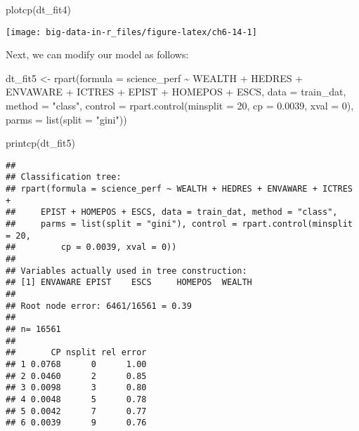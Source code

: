 \documentclass[
]{book}
\newenvironment{Shaded}{\begin{snugshade}}{\end{snugshade}}
\newcommand{\AttributeTok}[1]{\textcolor[rgb]{0.77,0.63,0.00}{#1}}
\newcommand{\DecValTok}[1]{\textcolor[rgb]{0.00,0.00,0.81}{#1}}
\newcommand{\FloatTok}[1]{\textcolor[rgb]{0.00,0.00,0.81}{#1}}
\newcommand{\FunctionTok}[1]{\textcolor[rgb]{0.00,0.00,0.00}{#1}}
\newcommand{\NormalTok}[1]{#1}
\newcommand{\OtherTok}[1]{\textcolor[rgb]{0.56,0.35,0.01}{#1}}
\newcommand{\SpecialCharTok}[1]{\textcolor[rgb]{0.00,0.00,0.00}{#1}}
\newcommand{\StringTok}[1]{\textcolor[rgb]{0.31,0.60,0.02}{#1}}
\begin{document}
\begin{Shaded}
\begin{Highlighting}[]
\FunctionTok{plotcp}\NormalTok{(dt\_fit4)}
\end{Highlighting}
\end{Shaded}

\texttt{[image: big-data-in-r\_files/figure-latex/ch6-14-1]}

Next, we can modify our model as follows:

\begin{Shaded}
\begin{Highlighting}[]
\NormalTok{dt\_fit5 }\OtherTok{\textless{}{-}} \FunctionTok{rpart}\NormalTok{(}\AttributeTok{formula =}\NormalTok{ science\_perf }\SpecialCharTok{\textasciitilde{}}\NormalTok{ WEALTH }\SpecialCharTok{+}\NormalTok{ HEDRES }\SpecialCharTok{+}\NormalTok{ ENVAWARE }\SpecialCharTok{+}\NormalTok{ ICTRES }\SpecialCharTok{+} 
\NormalTok{                   EPIST }\SpecialCharTok{+}\NormalTok{ HOMEPOS }\SpecialCharTok{+}\NormalTok{ ESCS,}
                 \AttributeTok{data =}\NormalTok{ train\_dat,}
                 \AttributeTok{method =} \StringTok{"class"}\NormalTok{, }
                 \AttributeTok{control =} \FunctionTok{rpart.control}\NormalTok{(}\AttributeTok{minsplit =} \DecValTok{20}\NormalTok{, }
                                         \AttributeTok{cp =} \FloatTok{0.0039}\NormalTok{,}
                                         \AttributeTok{xval =} \DecValTok{0}\NormalTok{),}
                \AttributeTok{parms =} \FunctionTok{list}\NormalTok{(}\AttributeTok{split =} \StringTok{"gini"}\NormalTok{))}

\FunctionTok{printcp}\NormalTok{(dt\_fit5)}
\end{Highlighting}
\end{Shaded}

\begin{verbatim}
## 
## Classification tree:
## rpart(formula = science_perf ~ WEALTH + HEDRES + ENVAWARE + ICTRES + 
##     EPIST + HOMEPOS + ESCS, data = train_dat, method = "class", 
##     parms = list(split = "gini"), control = rpart.control(minsplit = 20, 
##         cp = 0.0039, xval = 0))
## 
## Variables actually used in tree construction:
## [1] ENVAWARE EPIST    ESCS     HOMEPOS  WEALTH  
## 
## Root node error: 6461/16561 = 0.39
## 
## n= 16561 
## 
##       CP nsplit rel error
## 1 0.0768      0      1.00
## 2 0.0460      2      0.85
## 3 0.0098      3      0.80
## 4 0.0048      5      0.78
## 5 0.0042      7      0.77
## 6 0.0039      9      0.76
\end{verbatim}
\end{document}
